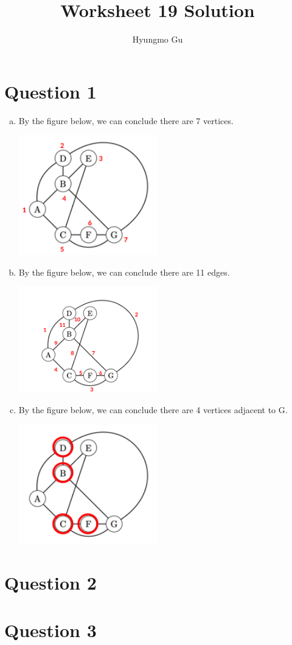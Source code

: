 \documentclass[12pt]{article}
\begin{document}
\title{Worksheet 19 Solution}
\author{Hyungmo Gu}
\maketitle

\section*{Question 1}
\begin{enumerate}[a.]
    \item
    By the figure below, we can conclude there are 7 vertices.

    \begin{center}
    \includegraphics[width=6cm]{images/worksheet_19_q1a_solution.png}
    \end{center}

    \item
    By the figure below, we can conclude there are 11 edges.

    \begin{center}
    \includegraphics[width=6cm]{images/worksheet_19_q1b_solution.png}
    \end{center}

    \newpage
    \item
    By the figure below, we can conclude there are 4 vertices adjacent to G.

    \begin{center}
    \includegraphics[width=6cm]{images/worksheet_19_q1c_solution.png}
    \end{center}

\end{enumerate}

\section*{Question 2}

\section*{Question 3}
\end{document}
